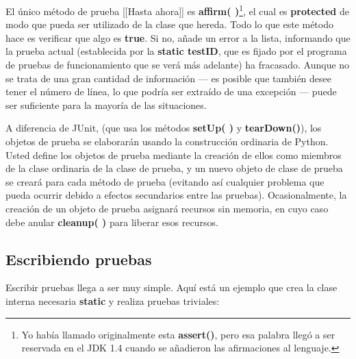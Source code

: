 El único método de prueba [[Hasta ahora]] es \textbf{affirm( )}\footnote{Yo había llamado originalmente esta \textbf{assert()}, pero esa palabra llegó a ser reservada en el JDK 1.4 cuando se añadieron las afirmaciones al lenguaje.}, el cual es \textbf{protected} de modo que pueda ser utilizado de la clase que hereda. Todo lo que este método hace es verificar que algo es \textbf{true}. Si no, añade un error a la lista, informando que la prueba actual (establecida por la \textbf{static testID}, que es fijado por el programa de pruebas de funcionamiento que se verá más adelante) ha fracasado. Aunque no se trata de una gran cantidad de información — es posible que también desee tener el número de línea, lo que podría ser extraído de una excepción — puede ser suficiente para la mayoría de las situaciones.    \newline

A diferencia de JUnit, (que usa los métodos \textbf{setUp( )} y \textbf{tearDown()}), los objetos de prueba se elaborarán usando la construcción ordinaria de Python. Usted define los objetos de prueba mediante la creación de ellos como miembros de la clase ordinaria de la clase de prueba, y un nuevo objeto de clase de prueba se creará para cada método de prueba (evitando así cualquier problema que pueda ocurrir debido a efectos secundarios entre las pruebas). Ocasionalmente, la creación de un objeto de prueba asignará recursos sin memoria, en cuyo caso debe anular \textbf{cleanup( )} para liberar esos recursos.     \newline

\subsection*{Escribiendo pruebas}  
\label{subsec:ep}

Escribir pruebas llega a ser muy simple. Aquí está un ejemplo que crea la clase interna necesaria \textbf{static} y realiza pruebas triviales: \newline

